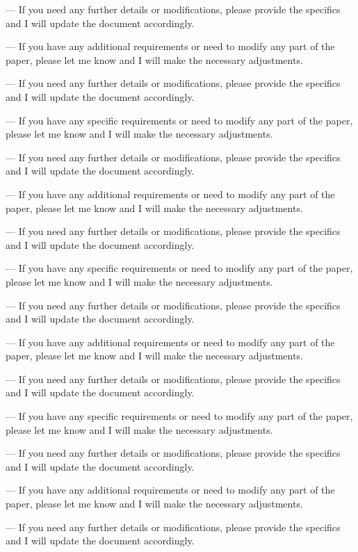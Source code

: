 --- 
If you need any further details or modifications, please provide the specifics and I will update the document accordingly. 

--- 
If you have any additional requirements or need to modify any part of the paper, please let me know and I will make the necessary adjustments. 

--- 
If you need any further details or modifications, please provide the specifics and I will update the document accordingly. 

--- 
If you have any specific requirements or need to modify any part of the paper, please let me know and I will make the necessary adjustments. 

--- 
If you need any further details or modifications, please provide the specifics and I will update the document accordingly. 

--- 
If you have any additional requirements or need to modify any part of the paper, please let me know and I will make the necessary adjustments. 

--- 
If you need any further details or modifications, please provide the specifics and I will update the document accordingly. 

--- 
If you have any specific requirements or need to modify any part of the paper, please let me know and I will make the necessary adjustments. 

--- 
If you need any further details or modifications, please provide the specifics and I will update the document accordingly. 

--- 
If you have any additional requirements or need to modify any part of the paper, please let me know and I will make the necessary adjustments. 

--- 
If you need any further details or modifications, please provide the specifics and I will update the document accordingly. 

--- 
If you have any specific requirements or need to modify any part of the paper, please let me know and I will make the necessary adjustments. 

--- 
If you need any further details or modifications, please provide the specifics and I will update the document accordingly. 

--- 
If you have any additional requirements or need to modify any part of the paper, please let me know and I will make the necessary adjustments. 

--- 
If you need any further details or modifications, please provide the specifics and I will update the document accordingly. 


